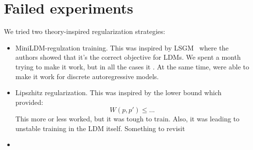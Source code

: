 \section{Failed experiments}
\label{ap:failed-experiments}


We tried two theory-inspired regularization strategies:
\begin{itemize}
    \item MiniLDM-regulzation training. This was inspired by LSGM~\cite{LSGM} where the authors showed that it's the correct objective for LDMs. We spent a month trying to make it work, but in all the cases it . At the same time, \cite{CausRegTok} were able to make it work for discrete autoregressive models.
    \item Lipszhitz regularization. This was inspired by the lower bound which \cite{LFM} provided:
    \begin{equation}
        W(p, p') \leq ...
    \end{equation}
    This more or less worked, but it was tough to train. Also, it was leading to unstable training in the LDM itself. Something to revisit
    \item 
\end{itemize}

